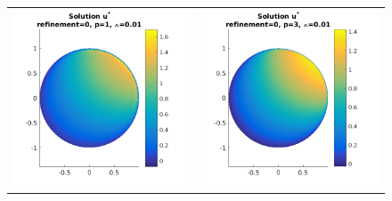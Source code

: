 \documentclass{article}
\begin{document}
\begin{figure}[!ht]
\centering
\begin{tabular}{c c}
\includegraphics[scale=0.7]{umustar_113.png} &
\includegraphics[scale=0.7]{umustar_213.png} \\

\end{tabular}
\end{figure}
\end{document}
